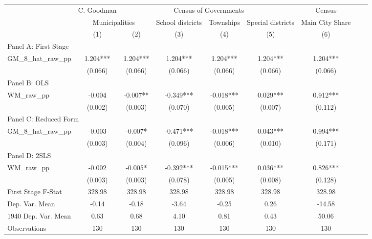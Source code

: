  \begin{tabular}{l*{8}{c}} \toprule
&\multicolumn{1}{c}{C. Goodman}&\multicolumn{4}{c}{Census of Governments}&\multicolumn{1}{c}{Census}\\\cmidrule(lr){2-2}\cmidrule(lr){3-6}\cmidrule(lr){7-7}
&\multicolumn{2}{c}{Municipalities}&\multicolumn{1}{c}{School districts}&\multicolumn{1}{c}{Townships}&\multicolumn{1}{c}{Special districts}&\multicolumn{1}{c}{Main City Share}\\\cmidrule(lr){2-3}\cmidrule(lr){4-6}\cmidrule(lr){7-7}
&\multicolumn{1}{c}{(1)}&\multicolumn{1}{c}{(2)}&\multicolumn{1}{c}{(3)}&\multicolumn{1}{c}{(4)}&\multicolumn{1}{c}{(5)}&\multicolumn{1}{c}{(6)}\\
\cmidrule(lr){1-7}
\multicolumn{6}{l}{Panel A: First Stage}\\
\cmidrule(lr){1-7}
GM\_8\_hat\_raw\_pp &    1.204***&    1.204***&    1.204***&    1.204***&    1.204***&    1.204***\\
                &  (0.066)   &  (0.066)   &  (0.066)   &  (0.066)   &  (0.066)   &  (0.066)   \\
\cmidrule(lr){1-7}
\multicolumn{6}{l}{Panel B: OLS}\\
\cmidrule(lr){1-7}
WM\_raw\_pp       &   -0.004   &   -0.007** &   -0.349***&   -0.018***&    0.029***&    0.912***\\
                &  (0.002)   &  (0.003)   &  (0.070)   &  (0.005)   &  (0.007)   &  (0.112)   \\
\cmidrule(lr){1-7}
\multicolumn{6}{l}{Panel C: Reduced Form}\\
\cmidrule(lr){1-7}
GM\_8\_hat\_raw\_pp &   -0.003   &   -0.007*  &   -0.471***&   -0.018***&    0.043***&    0.994***\\
                &  (0.003)   &  (0.004)   &  (0.096)   &  (0.006)   &  (0.010)   &  (0.171)   \\
\cmidrule(lr){1-7}
\multicolumn{6}{l}{Panel D: 2SLS}\\
\cmidrule(lr){1-7}
WM\_raw\_pp       &   -0.002   &   -0.005*  &   -0.392***&   -0.015***&    0.036***&    0.826***\\
                &  (0.003)   &  (0.003)   &  (0.078)   &  (0.005)   &  (0.008)   &  (0.128)   \\
\midrule
First Stage F-Stat&   328.98   &   328.98   &   328.98   &   328.98   &   328.98   &   328.98   \\
Dep. Var. Mean  &    -0.14   &    -0.18   &    -3.64   &    -0.25   &     0.26   &   -14.58   \\
1940 Dep. Var. Mean&     0.63   &     0.68   &     4.10   &     0.81   &     0.43   &    50.06   \\
Observations    &      130   &      130   &      130   &      130   &      130   &      130   \\
       \bottomrule \end{tabular}
